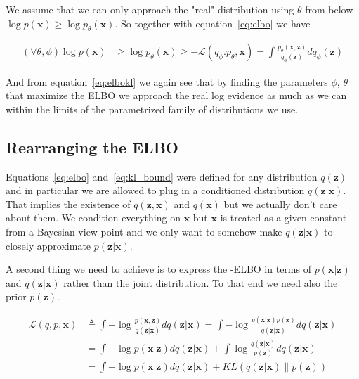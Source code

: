 \documentclass[11pt, a4paper]{report}
\theoremstyle{plain}
\theoremstyle{definition}
\newtheorem{mydef}{Definition}[chapter]
\theoremstyle{remark}
\newcommand{\X}{\mathbf{X}}
\newcommand{\x}{\mathbf{x}}
\newcommand{\z}{\mathbf{z}}
\begin{document}
We assume that we can only approach the "real" distribution using
$\theta$ from below $\log p(\x) \geq \log p_{\theta}(\x)$.
So together with equation~\ref{eq:elbo} we have

\begin{equation}\label{eq:parelbo}
\begin{aligned}
(\forall \theta, \phi)\log p(\x) & \geq \log p_{\theta}(\x) 
\geq -\mathcal{L}(q_{\phi}.p_{\theta},\x)
= \int \frac{p_{\theta}(\x,\z)}{q_{\phi}(\z)} dq_{\phi}(\z)
\end{aligned}
\end{equation}

And from equation~\ref{eq:elbokl} we again see that by finding the parameters
$\phi$, $\theta$ that maximize the ELBO we approach the real log evidence as much
as we can within the limits of the parametrized family of distributions we use.

\subsection{Rearranging the ELBO}
Equations~\ref{eq:elbo} and~\ref{eq:kl_bound} were defined for any distribution
$q(\z)$ and in particular we are allowed to plug in a conditioned
distribution $q(\z|\x)$. That implies the existence of $q(\z,\x)$ and $q(\x)$
but we actually don't care about them. We condition everything on $\x$ but $\x$
is treated as a given constant from a Bayesian view point and we only want to
somehow make $q(\z|\x)$ to closely approximate $p(\z | \x)$.

A second thing we need to achieve is to express the -ELBO in terms of $p(\x|\z)$
and $q(\z|\x)$ rather than the joint distribution. To that end we need also the
prior $p(\z)$.

\begin{equation}
\begin{aligned}
\mathcal{L}(q,p,\x) &\triangleq \int -\log \frac{p(\x,\z)}{q(\z|\x)}dq(\z|\x) 
= \int -\log \frac{p(\x |\z) p(\z)}{q(\z|\x)}dq(\z|\x) \\
&= \int -\log p(\x | \z)dq(\z|\x) + \int \log \frac{q(\z|\x)}{p(\z)}dq(\z|\x) \\
&= \int -\log p(\x | \z)dq(\z|\x) + KL(q(\z|\x) \| p(\z))
\label{eq:elbo_conditioned}
\end{aligned}
\end{equation}
\end{document}
